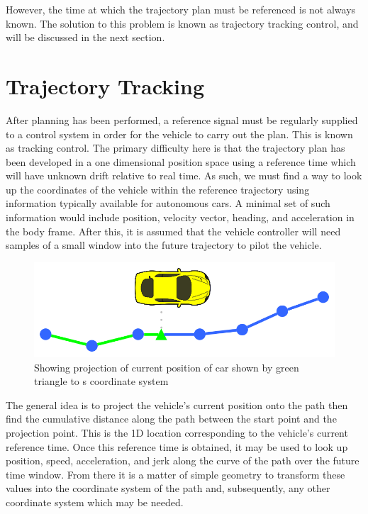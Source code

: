 \documentclass[letterpaper, 10 pt, conference]{ieeeconf}  %
\begin{document}
However, the time at which the trajectory plan must be referenced is not always known.
The solution to this problem is known as trajectory tracking control, and will be discussed in the next section.


\section{Trajectory Tracking} \label{sec:trajectorytracking}

After planning has been performed, a reference signal must be regularly supplied to a control system in order for the vehicle to carry out the plan.
This is known as tracking control.
The primary difficulty here is that the trajectory plan has been developed in a one dimensional position space using a reference time which will have unknown drift relative to real time.
As such, we must find a way to look up the coordinates of the vehicle within the reference trajectory using information typically available for autonomous cars.
A minimal set of such information would include position, velocity vector, heading, and acceleration in the body frame.
After this, it is assumed that the vehicle controller will need samples of a small window into the future trajectory to pilot the vehicle.

\begin{figure}[thpb]
  \centering
  \includegraphics[width=0.5\columnwidth]{graphics/PathProjection.png}
  \caption{Showing projection of current position of car shown by green triangle to s coordinate system}
  \label{fig:cartos}
\end{figure}

The general idea is to project the vehicle's current position onto the path then find the cumulative distance along the path between the start point and the projection point.
This is the 1D location corresponding to the vehicle's current reference time.
Once this reference time is obtained, it may be used to look up position, speed, acceleration, and jerk along the curve of the path over the future time window.
From there it is a matter of simple geometry to transform these values into the coordinate system of the path and, subsequently, any other coordinate system which may be needed.
\end{document}
